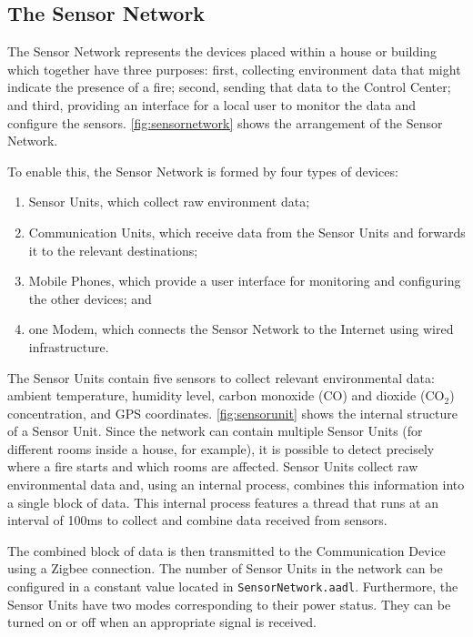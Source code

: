 \subsection{The Sensor Network}

The Sensor Network represents the devices placed within a house or building which together have three purposes: first, collecting environment data that might indicate the presence of a fire; second, sending that data to the Control Center; and third, providing an interface for a local user to monitor the data and configure the sensors. \autoref{fig:sensornetwork} shows the arrangement of the Sensor Network.

To enable this, the Sensor Network is formed by four types of devices:

\begin{enumerate}
	\item Sensor Units, which collect raw environment data;
	\item Communication Units, which receive data from the Sensor Units and forwards it to the relevant destinations;
	\item Mobile Phones, which provide a user interface for monitoring and configuring the other devices; and
	\item one Modem, which connects the Sensor Network to the Internet using wired infrastructure.
\end{enumerate}

The Sensor Units contain five sensors to collect relevant environmental data: ambient temperature, humidity level, carbon monoxide (CO) and dioxide (CO$_2$) concentration, and GPS coordinates.
\autoref{fig:sensorunit} shows the internal structure of a Sensor Unit. 
Since the network can contain multiple Sensor Units (for different rooms inside a house, for example), it is possible to detect precisely where a fire starts and which rooms are affected. 
Sensor Units collect raw environmental data and, using an internal process, combines this information into a single block of data. 
This internal process features a thread that runs at an interval of 100ms to collect and combine data received from sensors.

The combined block of data is then transmitted to the Communication Device using a Zigbee connection. The number of Sensor Units in the network can be configured in a constant value located in \texttt{SensorNetwork.aadl}. Furthermore, the Sensor Units have two modes corresponding to their power status. They can be turned on or off when an appropriate signal is received.

